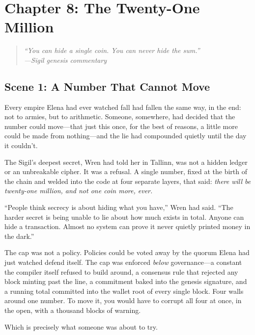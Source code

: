 \hypertarget{chapter-8-the-twenty-one-million}{%
\section{Chapter 8: The Twenty-One
Million}\label{chapter-8-the-twenty-one-million}}

\begin{quote}
\itshape ``You can hide a single coin. You can never hide the sum.''\\
\normalfont\hfill---Sigil genesis commentary
\end{quote}

\hypertarget{scene-1-a-number-that-cannot-move}{%
\subsection{Scene 1: A Number That Cannot
Move}\label{scene-1-a-number-that-cannot-move}}

Every empire Elena had ever watched fall had fallen the same way, in the end:
not to armies, but to arithmetic. Someone, somewhere, had decided that the
number could move---that just this once, for the best of reasons, a little more
could be made from nothing---and the lie had compounded quietly until the day it
couldn't.

The Sigil's deepest secret, Wren had told her in Tallinn, was not a hidden
ledger or an unbreakable cipher. It was a refusal. A single number, fixed at the
birth of the chain and welded into the code at four separate layers, that said:
\emph{there will be twenty-one million, and not one coin more, ever.}

``People think secrecy is about hiding what you have,'' Wren had said. ``The
harder secret is being unable to lie about how much exists in total. Anyone can
hide a transaction. Almost no system can prove it never quietly printed money in
the dark.''

The cap was not a policy. Policies could be voted away by the quorum Elena had
just watched defend itself. The cap was enforced \emph{below} governance---a
constant the compiler itself refused to build around, a consensus rule that
rejected any block minting past the line, a commitment baked into the genesis
signature, and a running total committed into the wallet root of every single
block. Four walls around one number. To move it, you would have to corrupt all
four at once, in the open, with a thousand blocks of warning.

Which is precisely what someone was about to try.

